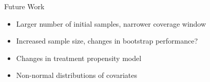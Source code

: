 \documentclass[
  ignorenonframetext,
]{beamer}
\providecommand{\tightlist}{%
  \setlength{\itemsep}{0pt}\setlength{\parskip}{0pt}}
\begin{document}
\begin{frame}{Future Work}
\protect\hypertarget{future-work}{}

\begin{itemize}[<+->]
\tightlist
\item
  Larger number of initial samples, narrower coverage window
\end{itemize}

\begin{itemize}[<+->]
\tightlist
\item
  Increased sample size, changes in bootstrap performance?
\end{itemize}

\begin{itemize}[<+->]
\tightlist
\item
  Changes in treatment propensity model
\end{itemize}

\begin{itemize}[<+->]
\tightlist
\item
  Non-normal distributions of covariates
\end{itemize}

\end{frame}
\end{document}
